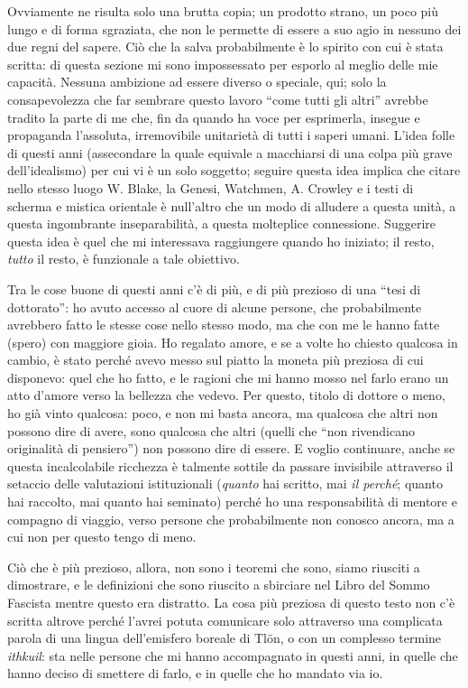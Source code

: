 Ovviamente ne risulta solo una brutta copia; un prodotto strano, un poco più lungo e di forma sgraziata, che non le permette di essere a suo agio in nessuno dei due regni del sapere. Ciò che la salva probabilmente è lo spirito con cui è stata scritta: di questa sezione mi sono impossessato per esporlo al meglio delle mie capacità. Nessuna ambizione ad essere diverso o speciale, qui; solo la consapevolezza che far sembrare questo lavoro ``come tutti gli altri'' avrebbe tradito la parte di me che, fin da quando ha voce per esprimerla, insegue e propaganda l'assoluta, irremovibile unitarietà di tutti i saperi umani. L'idea folle di questi anni (assecondare la quale equivale a macchiarsi di una colpa più grave dell'idealismo) per cui vi è un solo soggetto; seguire questa idea implica che citare nello stesso luogo W\@. Blake, la Genesi, Watchmen, A\@. Crowley e i testi di scherma e mistica orientale è null'altro che un modo di alludere a questa unità, a questa ingombrante inseparabilità, a questa molteplice connessione. Suggerire questa idea è quel che mi interessava raggiungere quando ho iniziato; il resto, \emph{tutto} il resto, è funzionale a tale obiettivo.

Tra le cose buone di questi anni c'è di più, e di più prezioso di una ``tesi di dottorato'': ho avuto accesso al cuore di alcune persone, che probabilmente avrebbero fatto le stesse cose nello stesso modo, ma che con me le hanno fatte (spero) con maggiore gioia. Ho regalato amore, e se a volte ho chiesto qualcosa in cambio, è stato perché avevo messo sul piatto la moneta più preziosa di cui disponevo: quel che ho fatto, e le ragioni che mi hanno mosso nel farlo erano un atto d'amore verso la bellezza che vedevo. Per questo, titolo di dottore o meno, ho già vinto qualcosa: poco, e non mi basta ancora, ma qualcosa che altri non possono dire di avere, sono qualcosa che altri (quelli che ``non rivendicano originalità di pensiero'') non possono dire di essere. E voglio continuare, anche se questa incalcolabile ricchezza è talmente sottile da passare invisibile attraverso il setaccio delle valutazioni istituzionali (\emph{quanto} hai scritto, mai \emph{il perché}; quanto hai raccolto, mai quanto hai seminato) perché ho una responsabilità di mentore e compagno di viaggio, verso persone che probabilmente non conosco ancora, ma a cui non per questo tengo di meno.

Ciò che è più prezioso, allora, non sono i teoremi che sono, siamo riusciti a dimostrare, e le definizioni che sono riuscito a sbirciare nel Libro del Sommo Fascista mentre questo era distratto. La cosa più preziosa di questo testo non c'è scritta altrove perché l'avrei potuta comunicare solo attraverso una complicata parola di una lingua dell'emisfero boreale di Tl\"on, o con un complesso termine \emph{ithkuil}: sta nelle persone che mi hanno accompagnato in questi anni, in quelle che hanno deciso di smettere di farlo, e in quelle che ho mandato via io. 

